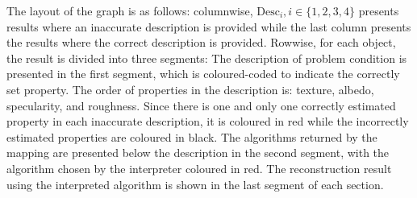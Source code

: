 The layout of the graph is as follows: columnwise, $\text{Desc}_i, i\in\{1, 2, 3, 4\}$ presents results where an inaccurate description is provided while the last column presents the results where the correct description is provided. Rowwise, for each object, the result is divided into three segments: The description of problem condition is presented in the first segment, which is coloured-coded to indicate the correctly set property. The order of properties in the description is: texture, albedo, specularity, and roughness. Since there is one and only one correctly estimated property in each inaccurate description, it is coloured in red while the incorrectly estimated properties are coloured in black. The algorithms returned by the mapping are presented below the description in the second segment, with the algorithm chosen by the interpreter coloured in red. The reconstruction result using the interpreted algorithm is shown in the last segment of each section.
